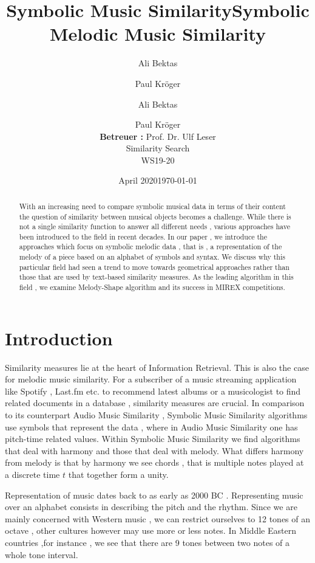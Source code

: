 \documentclass{llncs}
\title{Symbolic Music Similarity}
\author{Ali Bektas \and Paul Kröger}
\date{April 2020}
\title{Symbolic Melodic Music Similarity}
\author{Ali Bektas \and Paul Kröger \\ \textbf{Betreuer :} Prof. Dr. Ulf Leser \\ Similarity Search \\ WS19-20}
\date{\today}
\institute{ \vspace{5px} 
  	Humboldt Universität zu Berlin\\}
\begin{document}
    
    \let\oldaddcontentsline\addcontentsline
    \def\addcontentsline#1#2#3{}
    \mainmatter
    \maketitle
    \def\addcontentsline#1#2#3{\oldaddcontentsline{#1}{#2}{#3}}

	\tableofcontents
	
	\begin{abstract}
	With an increasing need to compare symbolic musical data in terms of their content 
	the question of similarity between musical objects becomes a challenge. While 
	there is not a single similarity function to answer all different needs , various approaches
	have been introduced to the field in recent decades. In our paper , we introduce the approaches
	which focus on symbolic melodic data , that is , a representation of the melody of a piece based on an alphabet
	of symbols and syntax. We discuss why this particular field had seen a trend to move towards geometrical approaches rather than those that are used by text-based similarity measures. As the leading algorithm in this field , we examine Melody-Shape algorithm and its success in MIREX competitions.
	\end{abstract}

	\section{Introduction}
		Similarity measures lie at the heart of Information Retrieval. This is also the case for melodic music similarity. For a subscriber of a music streaming application like Spotify , Last.fm etc. to recommend latest albums or a musicologist to find related documents in a database , similarity measures are crucial. In comparison to its counterpart Audio Music Similarity , Symbolic Music Similarity algorithms use symbols that represent the data , where in Audio Music Similarity one has pitch-time related values. Within Symbolic Music Similarity we find algorithms that deal with harmony and those that deal with melody. What differs harmony from melody is that by harmony we see chords , that is multiple notes played at a discrete time $t$ that together form a unity.  

		Representation of music dates back to as early as 2000 BC \cite{kil:civ}. Representing music over an alphabet consists in describing the pitch and the rhythm. Since we are mainly concerned with Western music , we can restrict ourselves to 12 tones of an octave , other cultures however may use more or less notes. In Middle Eastern countries ,for instance , we see that there are 9 tones between two notes of a whole tone interval.
\end{document}

